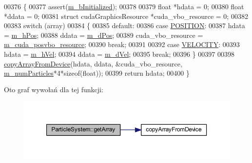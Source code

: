 \begin{DoxyCode}
00376 \{
00377     assert(\hyperlink{class_particle_system_a21bbfba9d8701a70bc6fddbf4fc3f5bd}{m\_bInitialized});
00378 
00379     \textcolor{keywordtype}{float} *hdata = 0;
00380     \textcolor{keywordtype}{float} *ddata = 0;
00381     \textcolor{keyword}{struct }cudaGraphicsResource *cuda\_vbo\_resource = 0;
00382 
00383     \textcolor{keywordflow}{switch} (array)
00384     \{
00385         \textcolor{keywordflow}{default}:
00386         \textcolor{keywordflow}{case} \hyperlink{class_particle_system_a332fbe57a36aaea5c18b4ea4fba6bbb3a9e9a2992d230a2674debf26e0e8e0299}{POSITION}:
00387             hdata = \hyperlink{class_particle_system_ab9d75471d2eaaeb8fa98d2f3f47d9c25}{m\_hPos};
00388             ddata = \hyperlink{class_particle_system_afff6217d2726217dff77c81ef3c23bfa}{m\_dPos};
00389             cuda\_vbo\_resource = \hyperlink{class_particle_system_a9c5de70c1705672e5722ad30dee1b14b}{m\_cuda\_posvbo\_resource};
00390             \textcolor{keywordflow}{break};
00391 
00392         \textcolor{keywordflow}{case} \hyperlink{class_particle_system_a332fbe57a36aaea5c18b4ea4fba6bbb3a3702de73065f01b4f6ffa604b799e53d}{VELOCITY}:
00393             hdata = \hyperlink{class_particle_system_a20560c896ee8a8bbc827a8e5902da7e2}{m\_hVel};
00394             ddata = \hyperlink{class_particle_system_a5efd31a2fdba8d98b105f4e546964cb5}{m\_dVel};
00395             \textcolor{keywordflow}{break};
00396     \}
00397 
00398     \hyperlink{particles_8cpp_afed059fa8ae6691333d263c5c88281f6}{copyArrayFromDevice}(hdata, ddata, &cuda\_vbo\_resource, 
      \hyperlink{class_particle_system_a23d238efa80a647d4b6cde034f486a91}{m\_numParticles}*4*\textcolor{keyword}{sizeof}(\textcolor{keywordtype}{float}));
00399     \textcolor{keywordflow}{return} hdata;
00400 \}
\end{DoxyCode}


Oto graf wywołań dla tej funkcji\-:\nopagebreak
\begin{figure}[H]
\begin{center}
\leavevmode
\includegraphics[width=350pt]{class_particle_system_a8bdfaa6198651ef0ceb8be489ecd78e3_cgraph}
\end{center}
\end{figure}


